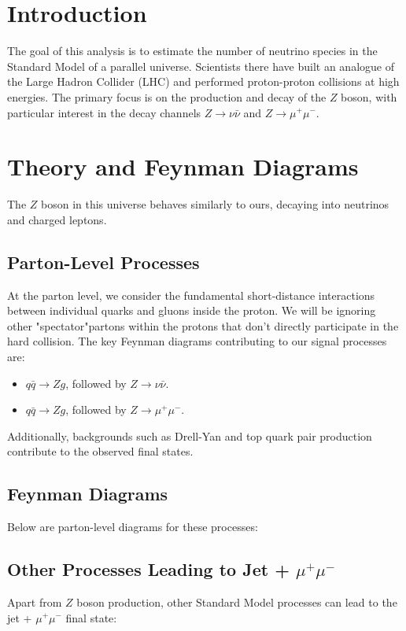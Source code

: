 \section{Introduction}
The goal of this analysis is to estimate the number of neutrino species in the Standard Model of a parallel universe. Scientists there have built an analogue of the Large Hadron Collider (LHC) and performed proton-proton collisions at high energies. The primary focus is on the production and decay of the $Z$ boson, with particular interest in the decay channels $Z \to \nu \bar{\nu}$ and $Z \to \mu^+ \mu^-$. 

\section{Theory and Feynman Diagrams}
The $Z$ boson in this universe behaves similarly to ours, decaying into neutrinos and charged leptons. 

\subsection{Parton-Level Processes}
At the parton level, we consider the fundamental short-distance interactions between individual quarks and gluons inside the proton. We will be ignoring other "spectator"partons within the protons that don't directly participate in the hard collision.  The key Feynman diagrams contributing to our signal processes are:

\begin{itemize}
    \item $q \bar{q} \to Z g$, followed by $Z \to \nu \bar{\nu}$.
    \item $q \bar{q} \to Z g$, followed by $Z \to \mu^+ \mu^-$. 
\end{itemize}

Additionally, backgrounds such as Drell-Yan and top quark pair production contribute to the observed final states.

\subsection{Feynman Diagrams}
Below are parton-level diagrams for these processes:



\subsection{Other Processes Leading to Jet + $\mu^+ \mu^-$}
Apart from $Z$ boson production, other Standard Model processes can lead to the jet + $\mu^+ \mu^-$ final state:

